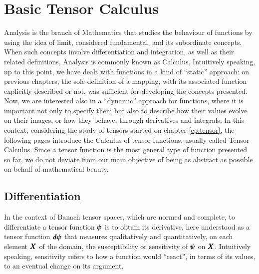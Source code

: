 
\chapter{Basic Tensor Calculus}

Analysis is the branch of Mathematics that studies the behaviour of functions by using the idea of limit, considered fundamental, and its subordinate concepts. When such concepts involve  differentiation and integration, as well as their related definitions, Analysis is commonly known as Calculus. Intuitively speaking, up to this point, we have dealt with functions in a kind of ``static'' approach: on previous chapters, the sole definition of a mapping, with its associated function explicitly described or not, was sufficient for developing the concepts presented. Now, we are interested also in a ``dynamic'' approach for functions, where it is important not only to specify them but also to describe how their values evolve on their images, or how they behave, through derivatives and integrals. In this context, considering the study of tensors started on chapter \ref{cp:tensor}, the following pages introduce the Calculus of tensor functions, usually called Tensor Calculus. Since a tensor function is the most general type of function presented so far, we do not deviate from our main objective of being as abstract as possible on behalf of mathematical beauty.  



\section{Differentiation}

In the context of Banach tensor spaces, which are normed and complete, to differentiate a tensor function $\pmb{\psi}$ is to obtain its derivative, here understood as a tensor function $\pmb{\mathit{d}\psi}$ that measures qualitatively and quantitatively, on each element $\pmb{X}$ of the domain, the susceptibility or sensitivity of $\pmb{\psi}$ on $\pmb{X}$. Intuitively speaking, sensitivity refers to how a function would ``react'', in terms of its values, to an eventual change on its argument.     
  

    